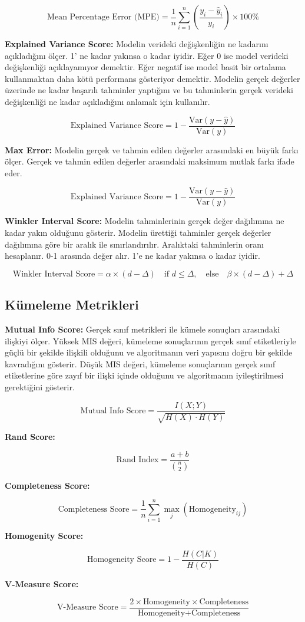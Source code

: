 \[\text{Mean Percentage Error (MPE)} = \frac{1}{n} \sum_{i=1}^{n} \left( \frac{y_i - \hat{y}_i}{y_i} \right) \times 100\%\]

\textbf{Explained Variance Score:} Modelin verideki değişkenliğin ne kadarını açıkladığını ölçer. 1' ne kadar yakınsa o kadar iyidir. Eğer 0 ise model verideki değişkenliği açıklayamıyor demektir. Eğer negatif ise model basit bir ortalama kullanmaktan daha kötü performans gösteriyor demektir. Modelin gerçek değerler üzerinde ne kadar başarılı tahminler yaptığını ve bu tahminlerin gerçek verideki değişkenliği ne kadar açıkladığını anlamak için kullanılır.

\[\text{Explained Variance Score} = 1 - \frac{\text{Var}(y - \hat{y})}{\text{Var}(y)}\]

\textbf{Max Error:} Modelin gerçek ve tahmin edilen değerler arasındaki en büyük farkı ölçer. Gerçek ve tahmin edilen değerler arasındaki maksimum mutlak farkı ifade eder.

\[\text{Explained Variance Score} = 1 - \frac{\text{Var}(y - \hat{y})}{\text{Var}(y)}\]

\textbf{Winkler Interval Score:} Modelin tahminlerinin gerçek değer dağılımına ne kadar yakın olduğunu gösterir. Modelin ürettiği tahminler gerçek değerler dağılımına göre bir aralık ile sınırlandırılır. Aralıktaki tahminlerin oranı hesaplanır. 0-1 arasında değer alır. 1'e ne kadar yakınsa o kadar iyidir.

\[\text{Winkler Interval Score} = \alpha \times (d - \Delta) \quad \text{if } d \leq \Delta, \quad \text{else} \quad \beta \times (d - \Delta) + \Delta\]

\subsection{Kümeleme Metrikleri}

\textbf{Mutual Info Score:} Gerçek sınıf metrikleri ile kümele sonuçları arasındaki ilişkiyi ölçer. Yüksek MIS değeri, kümeleme sonuçlarının gerçek sınıf etiketleriyle güçlü bir şekilde ilişkili olduğunu ve algoritmanın veri yapısını doğru bir şekilde kavradığını gösterir. Düşük MIS değeri, kümeleme sonuçlarının gerçek sınıf etiketlerine göre zayıf bir ilişki içinde olduğunu ve algoritmanın iyileştirilmesi gerektiğini gösterir.

\[\text{Mutual Info Score} = \frac{I(X;Y)}{\sqrt{H(X) \cdot H(Y)}}\]

\textbf{Rand Score:}

\[\text{Rand Index} = \frac{a + b}{\binom{n}{2}}\]

\textbf{Completeness Score:}

\[\text{Completeness Score} = \frac{1}{n} \sum_{i=1}^{n} \max_j (\text{Homogeneity}_{ij})\]

\textbf{Homogenity Score:}

\[\text{Homogeneity Score} = 1 - \frac{H(C|K)}{H(C)}\]

\textbf{V-Measure Score:}

\[\text{V-Measure Score} = \frac{2 \times \text{Homogeneity} \times \text{Completeness}}{\text{Homogeneity} + \text{Completeness}}\]

\newpage